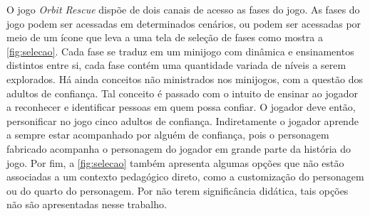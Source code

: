 \vspace{-0.3cm}


O jogo \textit{Orbit Rescue} dispõe de dois canais de acesso as fases do jogo. As fases do jogo podem ser acessadas em determinados cenários, ou podem ser acessadas por meio de um ícone que leva a uma tela de seleção de fases como mostra a \autoref{fig:selecao}. Cada fase se traduz em um minijogo com dinâmica e ensinamentos distintos entre si, cada fase contém uma quantidade variada de níveis a serem explorados. Há ainda conceitos não ministrados nos minijogos, com a questão dos adultos de confiança. Tal conceito é passado com o intuito de ensinar ao jogador a reconhecer e identificar pessoas em quem possa confiar. O jogador deve então, personificar no jogo cinco adultos de confiança. Indiretamente o jogador aprende a sempre estar acompanhado por alguém de confiança, pois o personagem fabricado acompanha o personagem do jogador em grande parte da história do jogo. Por fim, a \autoref{fig:selecao} também apresenta algumas opções que não estão associadas a um contexto pedagógico direto, como a customização do personagem ou do quarto do personagem. Por não terem significância didática, tais opções não são apresentadas nesse trabalho. 


